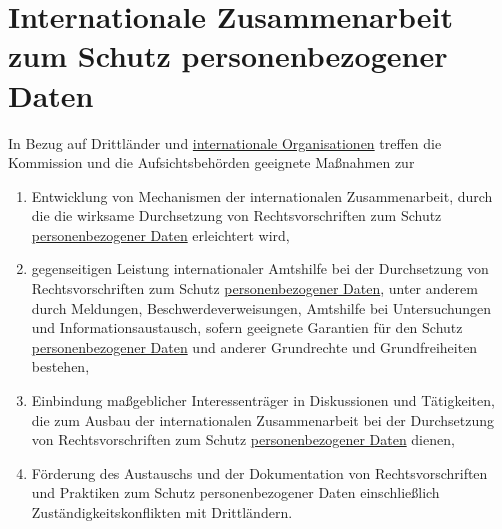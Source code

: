 \chapter{Internationale Zusammenarbeit zum Schutz personenbezogener Daten}
\label{ch:50}


In Bezug auf Drittländer und \hyperref[itm:04-29]{internationale Organisationen} treffen die Kommission und die Aufsichtsbehörden geeignete
Maßnahmen zur

\begin{enumerate}[label=\alph*)]
  
  \item Entwicklung von Mechanismen der internationalen Zusammenarbeit, durch die die wirksame Durchsetzung von
   Rechtsvorschriften zum Schutz \hyperref[itm:04-1]{personenbezogener Daten} erleichtert wird,
  \label{itm:50-a}

  \item gegenseitigen Leistung internationaler Amtshilfe bei der Durchsetzung von Rechtsvorschriften zum Schutz
   \hyperref[itm:04-1]{personenbezogener Daten}, unter anderem durch Meldungen, Beschwerdeverweisungen, Amtshilfe bei Untersuchungen und
   Informationsaustausch, sofern geeignete Garantien für den Schutz \hyperref[itm:04-1]{personenbezogener Daten} und anderer Grundrechte und
   Grundfreiheiten bestehen,
  \label{itm:50-b}

  \item Einbindung maßgeblicher Interessenträger in Diskussionen und Tätigkeiten, die zum Ausbau der internationalen
   Zusammenarbeit bei der Durchsetzung von Rechtsvorschriften zum Schutz \hyperref[itm:04-1]{personenbezogener Daten} dienen,
  \label{itm:50-c}

  \item Förderung des Austauschs und der Dokumentation von Rechtsvorschriften und Praktiken zum Schutz personenbezogener
   Daten einschließlich Zuständigkeitskonflikten mit Drittländern.
  \label{itm:50-d}

\end{enumerate}


